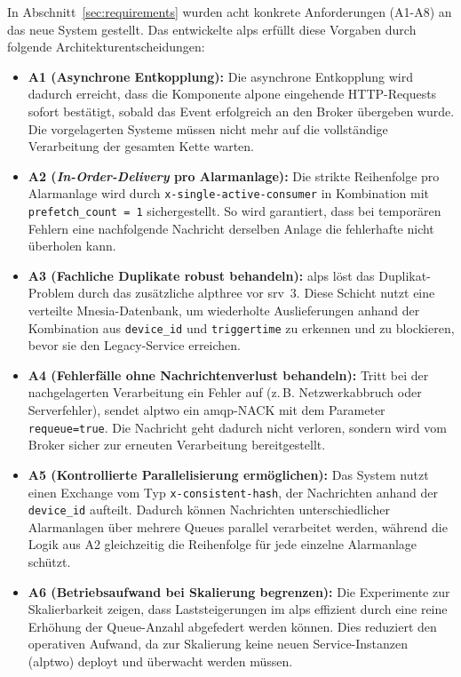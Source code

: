 In Abschnitt~\ref{sec:requirements}  wurden acht konkrete Anforderungen (A1-A8) an das neue System gestellt. Das entwickelte \gls{alps} erfüllt diese Vorgaben durch folgende Architekturentscheidungen:

\begin{itemize}
    \item \textbf{A1 (Asynchrone Entkopplung):} Die asynchrone Entkopplung wird dadurch erreicht, dass die Komponente \gls{alpone} eingehende HTTP-Requests sofort bestätigt, sobald das Event erfolgreich an den Broker übergeben wurde. Die vorgelagerten Systeme müssen nicht mehr auf die vollständige Verarbeitung der gesamten Kette warten.

    \item \textbf{A2 (\textit{In-Order-Delivery} pro Alarmanlage):} Die strikte Reihenfolge pro Alarmanlage wird durch \texttt{x-single-active-consumer} in Kombination mit \texttt{prefetch\_count = 1} sichergestellt. So wird garantiert, dass bei temporären Fehlern eine nachfolgende Nachricht derselben Anlage die fehlerhafte nicht überholen kann.

    \item \textbf{A3 (Fachliche Duplikate robust behandeln):} \gls{alps} löst das Duplikat-Problem durch das zusätzliche \gls{alpthree} vor \gls{srv}~3. Diese Schicht nutzt eine verteilte Mnesia-Datenbank, um wiederholte Auslieferungen anhand der Kombination aus \texttt{device\_id} und \texttt{triggertime} zu erkennen und zu blockieren, bevor sie den Legacy-Service erreichen.

    \item \textbf{A4 (Fehlerfälle ohne Nachrichtenverlust behandeln):} Tritt bei der nachgelagerten Verarbeitung ein Fehler auf (z.\,B. Netzwerkabbruch oder Serverfehler), sendet \gls{alptwo} ein \gls{amqp}-NACK mit dem Parameter \texttt{requeue=true}. Die Nachricht geht dadurch nicht verloren, sondern wird vom Broker sicher zur erneuten Verarbeitung bereitgestellt.

    \item \textbf{A5 (Kontrollierte Parallelisierung ermöglichen):} Das System nutzt einen Exchange vom Typ \texttt{x-consistent-hash}, der Nachrichten anhand der \texttt{device\_id} aufteilt. Dadurch können Nachrichten unterschiedlicher Alarmanlagen über mehrere Queues parallel verarbeitet werden, während die Logik aus A2 gleichzeitig die Reihenfolge für jede einzelne Alarmanlage schützt.

    \item \textbf{A6 (Betriebsaufwand bei Skalierung begrenzen):} Die Experimente zur Skalierbarkeit zeigen, dass Laststeigerungen im \gls{alps} effizient durch eine reine Erhöhung der Queue-Anzahl abgefedert werden können. Dies reduziert den operativen Aufwand, da zur Skalierung keine neuen Service-Instanzen (\gls{alptwo}) deployt und überwacht werden müssen.


\end{itemize}
